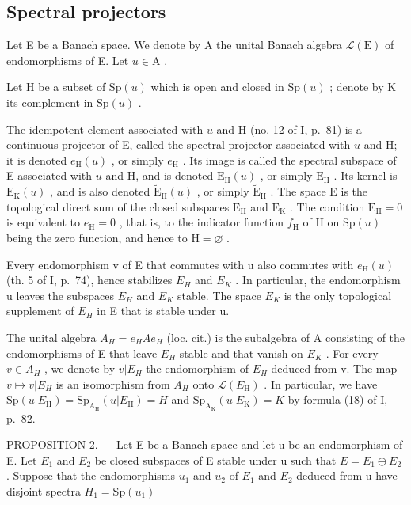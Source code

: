 \subsection{Spectral projectors}

Let E be a Banach space. We denote by A the unital Banach algebra \(\mathcal{L}(\mathrm{E})\) of endomorphisms of E. Let \(u\in \mathrm{A}\) .

Let H be a subset of \(\mathrm{Sp}(u)\) which is open and closed in \(\mathrm{Sp}(u)\) ; denote by K its complement in \(\mathrm{Sp}(u)\) .

The idempotent element associated with \(u\) and H (no. 12 of I, p.~81) is a continuous projector of E, called the spectral projector associated with \(u\) and H; it is denoted \(e_{\mathrm{H}}(u)\) , or simply \(e_{\mathrm{H}}\) . Its image is called the spectral subspace of E associated with \(u\) and H, and is denoted \(\mathrm{E_H}(u)\) , or simply \(\mathrm{E_H}\) . Its kernel is \(\mathrm{E_K}(u)\) , and is also denoted \(\widetilde{\mathrm{E}}_{\mathrm{H}}(u)\) , or simply \(\widetilde{\mathrm{E}}_{\mathrm{H}}\) . The space E is the topological direct sum of the closed subspaces \(\mathrm{E_H}\) and \(\mathrm{E_K}\) . The condition \(\mathrm{E_H} = 0\) is equivalent to \(e_{\mathrm{H}} = 0\) , that is, to the indicator function \(f_{\mathrm{H}}\) of H on \(\mathrm{Sp}(u)\) being the zero function, and hence to \(\mathrm{H} = \varnothing\) .

Every endomorphism v of E that commutes with u also commutes with \(e_{\mathrm{H}}(u)\) (th. 5 of I, p.~74), hence stabilizes \(E_{H}\) and \(E_{K}\) . In particular, the endomorphism u leaves the subspaces \(E_{H}\) and \(E_{K}\) stable. The space \(E_{K}\) is the only topological supplement of \(E_{H}\) in E that is stable under u.

The unital algebra \(A_{H} = e_{H}Ae_{H}\) (loc. cit.) is the subalgebra of A consisting of the endomorphisms of E that leave \(E_{H}\) stable and that vanish on \(E_{K}\) . For every \(v \in A_{H}\) , we denote by \(v|E_{H}\) the endomorphism of \(E_{H}\) deduced from v. The map \(v \mapsto v|E_{H}\) is an isomorphism from \(A_{H}\) onto \(\mathcal{L}(E_{\mathrm{H}})\) . In particular, we have \(\mathrm{Sp}(u|E_{\mathrm{H}}) = \mathrm{Sp}_{\mathrm{A}_{\mathrm{H}}} (u|E_{\mathrm{H}}) = H\) and \(\mathrm{Sp}_{\mathrm{A}_{\mathrm{K}}} (u|E_{\mathrm{K}}) = K\) by formula (18) of I, p.~82.

PROPOSITION 2. --- Let E be a Banach space and let u be an endomorphism of E. Let \(E_{1}\) and \(E_{2}\) be closed subspaces of E stable under u such that \(E = E_{1} \oplus E_{2}\) . Suppose that the endomorphisms \(u_{1}\) and \(u_{2}\) of \(E_{1}\) and \(E_{2}\) deduced from u have disjoint spectra \(H_{1} = \mathrm{Sp}(u_{1})\)

